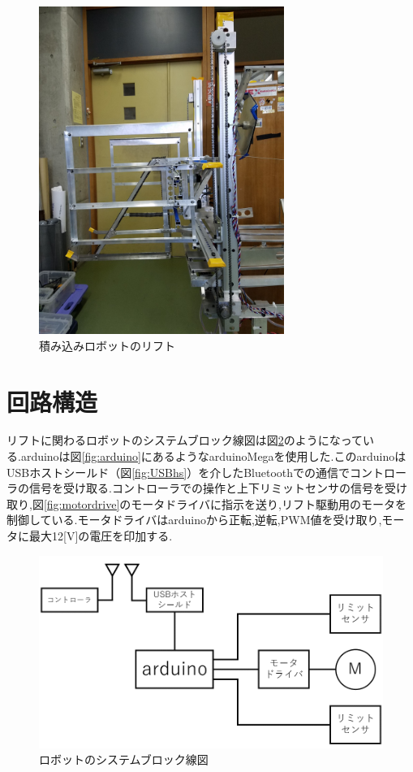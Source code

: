 \begin{figure}[htbp]
  \begin{center}
    \includegraphics[width=80mm]{img/lift.jpg}
    \end{center}
  \caption{積み込みロボットのリフト}
 \label{fig:lift}
\end{figure}

\section{回路構造}
リフトに関わるロボットのシステムブロック線図は図\ref{fig:roboblock}のようになっている.arduinoは図\ref{fig:arduino}にあるようなarduinoMegaを使用した.このarduinoはUSBホストシールド（図\ref{fig:USBhs}）を介したBluetoothでの通信でコントローラの信号を受け取る.コントローラでの操作と上下リミットセンサの信号を受け取り,図\ref{fig:motordrive}のモータドライバに指示を送り,リフト駆動用のモータを制御している.モータドライバはarduinoから正転,逆転,PWM値を受け取り,モータに最大12[V]の電圧を印加する.

\begin{figure}[htbp]
  \begin{center}
    \includegraphics[width=120mm]{img/roboblock.png}
    \end{center}
  \caption{ロボットのシステムブロック線図}
 \label{fig:roboblock}
\end{figure}

